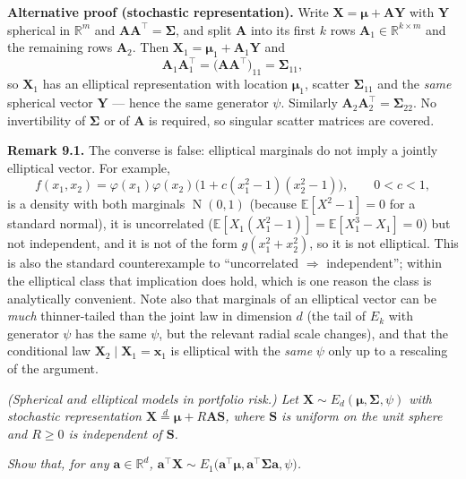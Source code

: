 \documentclass{MFM-hw} %
\newcommand{\real}{\mathbb{R}}
\newcommand{\normal}{\operatorname{N}}
\newcommand{\E}{\mathbb{E}}
\newcommand{\bX}{\bm{X}}
\newcommand{\bY}{\bm{Y}}
\newcommand{\bA}{\bm{A}}
\newcommand{\bS}{\bm{S}}
\newcommand{\bx}{\bm{x}}
\newcommand{\ba}{\bm{a}}
\newcommand{\bmu}{\bm{\mu}}
\newcommand{\bSigma}{\bm{\Sigma}}
\begin{document}
\smallskip
\noindent\textbf{Alternative proof (stochastic representation).} Write $\bX=\bmu+\bA\bY$ with $\bY$ spherical in $\real^m$ and $\bA\bA^\top=\bSigma$, and split $\bA$ into its first $k$ rows $\bA_1\in\real^{k\times m}$ and the remaining rows $\bA_2$. Then $\bX_1=\bmu_1+\bA_1\bY$ and
\[
    \bA_1\bA_1^\top=\bigl(\bA\bA^\top\bigr)_{11}=\bSigma_{11},
\]
so $\bX_1$ has an elliptical representation with location $\bmu_1$, scatter $\bSigma_{11}$ and the \emph{same} spherical vector $\bY$ --- hence the same generator $\psi$. Similarly $\bA_2\bA_2^\top=\bSigma_{22}$. No invertibility of $\bSigma$ or of $\bA$ is required, so singular scatter matrices are covered.

\smallskip
\noindent\textbf{Remark 9.1.} The converse is false: elliptical marginals do not imply a jointly elliptical vector. For example,
\[
    f(x_1,x_2)=\varphi(x_1)\varphi(x_2)\bigl(1+c(x_1^2-1)(x_2^2-1)\bigr),\qquad 0<c<1,
\]
is a density with both marginals $\normal(0,1)$ (because $\E[X^2-1]=0$ for a standard normal), it is uncorrelated ($\E[X_1(X_1^2-1)]=\E[X_1^3-X_1]=0$) but not independent, and it is not of the form $g(x_1^2+x_2^2)$, so it is not elliptical. This is also the standard counterexample to ``uncorrelated $\Rightarrow$ independent''; within the elliptical class that implication does hold, which is one reason the class is analytically convenient. Note also that marginals of an elliptical vector can be \emph{much} thinner-tailed than the joint law in dimension $d$ (the tail of $E_k$ with generator $\psi$ has the same $\psi$, but the relevant radial scale changes), and that the conditional law $\bX_2\mid\bX_1=\bx_1$ is elliptical with the \emph{same} $\psi$ only up to a rescaling of the argument.

\HWproblem
\noindent\textit{(Spherical and elliptical models in portfolio risk.) Let $\bX\sim E_d(\bmu,\bSigma,\psi)$ with stochastic representation $\bX\overset{d}{=}\bmu+R\bA\bS$, where $\bS$ is uniform on the unit sphere and $R\ge0$ is independent of $\bS$.}

\HWsubproblem
\noindent\textit{Show that, for any $\ba\in\real^d$, $\ba^\top\bX\sim E_1\bigl(\ba^\top\bmu,\ba^\top\bSigma\ba,\psi\bigr)$.}
\end{document}
